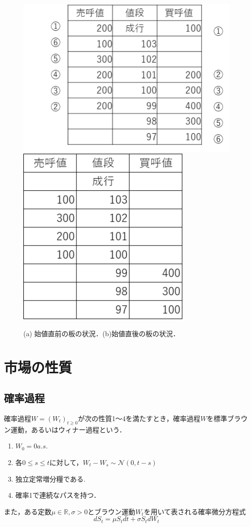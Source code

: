 \documentclass[titlepage]{jsreport}
\begin{document}
\begin{figure}[htbp]
    \centering
    \includegraphics[width=0.49\linewidth]{fig/itayose.pdf}
    \hfil
    \includegraphics[width=0.335\linewidth]{fig/continuous.pdf}
    \caption{(a) 始値直前の板の状況．(b)始値直後の板の状況．}
    \label{fig:opening}
\end{figure}

\section{市場の性質}
\subsection{確率過程}
確率過程$W = (W_t)_{t \geq 0}$が次の性質1～4を満たすとき，確率過程$W$を標準ブラウン運動，あるいはウィナー過程という\cite{stochastic_integration}．
\begin{enumerate}
    \item $W_0 = 0  a.s.$
    \item 各$0 \leq s \leq t$に対して，$W_t - W_s \sim \mathcal{N}(0, t - s)$
    \item 独立定常増分糧である.
    \item 確率1で連続なパスを持つ．
\end{enumerate}

また，ある定数$\mu \in \mathbb{R}, \sigma > 0$とブラウン運動$W_t$を用いて表される確率微分方程式
\begin{equation}
    dS_t = \mu S_t dt + \sigma S_t dW_t \label{eq:geoBrow_equation}
\end{equation}
\end{document}
